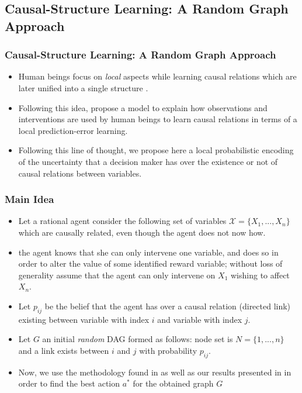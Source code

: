 \documentclass{beamer}
\theoremstyle{plain}
\begin{document}
\subsection{Causal-Structure Learning: A Random Graph Approach}{\label{random_graph}}
\begin{frame}
\frametitle{Causal-Structure Learning: A Random Graph Approach}
\begin{itemize}
\item Human beings focus on \textit{local} aspects while learning causal relations which are later unified into a single structure \citep{fernbach2009causal,waldmann2008causal, danks2014unifying}.
\item Following this idea, \cite{wellen2012learning} propose a model to explain how observations  and interventions are used by human beings to learn causal relations in terms of a local prediction-error learning.
\item Following this line of thought, we propose here a local probabilistic encoding of the uncertainty that a decision maker has over the existence or not of causal relations between variables.
\end{itemize}
\end{frame}

\begin{frame}
\frametitle{Main Idea}
\begin{itemize}
\item Let a rational agent consider the following set of variables $\mathcal{X}=\{ X_1,...,X_n \}$ which are causally related, even though the agent does not now how.
\item the agent knows that she can only intervene one variable, and does so in order to alter the value of some  identified reward variable; without loss of generality assume that the agent can only intervene on $X_1$ wishing to affect $X_n$.
\item Let $p_{ij}$ be the belief that the agent has over a causal relation (directed link) existing between variable with index $i$ and variable with index $j$.
\item Let $G$ an initial {\em random} DAG formed as follows: node set is $N=\{1,...,n\}$ and a link exists between $i$ and $j$ with probability $p_{ij}$.
\item Now, we use the methodology found in \cite{gonzalez2018playing}  as well as our results presented in \cite{gonzalez2019theorems} in order to find the best action $a^\ast$ for the obtained graph $G$
\end{itemize}
\end{frame}
\end{document}
